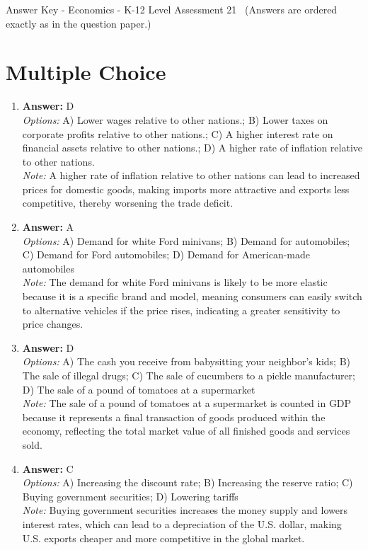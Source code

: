 \documentclass[12pt]{article}
\begin{document}
\begin{center}
Answer Key - Economics - K-12 Level Assessment 21 \
\small (Answers are ordered exactly as in the question paper.)
\end{center}

\section*{Multiple Choice}
\begin{enumerate}[label=\arabic*.]
\item \textbf{Answer:} D
\\ \textit{Options:} A) Lower wages relative to other nations.; B) Lower taxes on corporate profits relative to other nations.; C) A higher interest rate on financial assets relative to other nations.; D) A higher rate of inflation relative to other nations.
\\ \textit{Note:} A higher rate of inflation relative to other nations can lead to increased prices for domestic goods, making imports more attractive and exports less competitive, thereby worsening the trade deficit.
\item \textbf{Answer:} A
\\ \textit{Options:} A) Demand for white Ford minivans; B) Demand for automobiles; C) Demand for Ford automobiles; D) Demand for American-made automobiles
\\ \textit{Note:} The demand for white Ford minivans is likely to be more elastic because it is a specific brand and model, meaning consumers can easily switch to alternative vehicles if the price rises, indicating a greater sensitivity to price changes.
\item \textbf{Answer:} D
\\ \textit{Options:} A) The cash you receive from babysitting your neighbor's kids; B) The sale of illegal drugs; C) The sale of cucumbers to a pickle manufacturer; D) The sale of a pound of tomatoes at a supermarket
\\ \textit{Note:} The sale of a pound of tomatoes at a supermarket is counted in GDP because it represents a final transaction of goods produced within the economy, reflecting the total market value of all finished goods and services sold.
\item \textbf{Answer:} C
\\ \textit{Options:} A) Increasing the discount rate; B) Increasing the reserve ratio; C) Buying government securities; D) Lowering tariffs
\\ \textit{Note:} Buying government securities increases the money supply and lowers interest rates, which can lead to a depreciation of the U.S. dollar, making U.S. exports cheaper and more competitive in the global market.

\end{enumerate}
\end{document}
